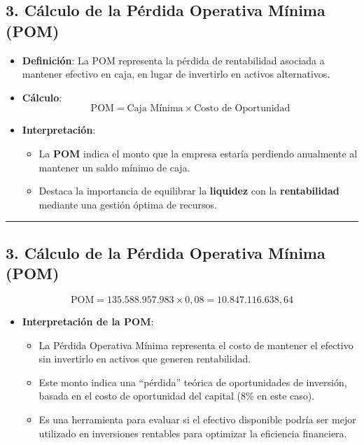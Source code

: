 \documentclass[
  letterpaper,
  DIV=11,
  numbers=noendperiod]{scrartcl}
\providecommand{\tightlist}{%
  \setlength{\itemsep}{0pt}\setlength{\parskip}{0pt}}\usepackage{longtable,booktabs,array}
\begin{document}
\subsection{3. Cálculo de la Pérdida Operativa Mínima
(POM)}\label{cuxe1lculo-de-la-puxe9rdida-operativa-muxednima-pom}

\begin{itemize}
\item
  \textbf{Definición}: La POM representa la pérdida de rentabilidad
  asociada a mantener efectivo en caja, en lugar de invertirlo en
  activos alternativos.
\item
  \textbf{Cálculo}: \[
   \text{POM} = \text{Caja Mínima} \times \text{Costo de Oportunidad}
   \]
\item
  \textbf{Interpretación}:

  \begin{itemize}
  \tightlist
  \item
    La \textbf{POM} indica el monto que la empresa estaría perdiendo
    anualmente al mantener un saldo mínimo de caja.
  \item
    Destaca la importancia de equilibrar la \textbf{liquidez} con la
    \textbf{rentabilidad} mediante una gestión óptima de recursos.
  \end{itemize}
\end{itemize}

\begin{center}\rule{0.5\linewidth}{0.5pt}\end{center}

\subsection{3. Cálculo de la Pérdida Operativa Mínima
(POM)}\label{cuxe1lculo-de-la-puxe9rdida-operativa-muxednima-pom-1}

\[
\text{POM} = 135.588.957.983 \times 0,08 = 10.847.116.638,64
\]

\begin{itemize}
\tightlist
\item
  \textbf{Interpretación de la POM}:

  \begin{itemize}
  \tightlist
  \item
    La Pérdida Operativa Mínima representa el costo de mantener el
    efectivo sin invertirlo en activos que generen rentabilidad.
  \item
    Este monto indica una ``pérdida'' teórica de oportunidades de
    inversión, basada en el costo de oportunidad del capital (8\% en
    este caso).
  \item
    Es una herramienta para evaluar si el efectivo disponible podría ser
    mejor utilizado en inversiones rentables para optimizar la
    eficiencia financiera.
  \end{itemize}
\end{itemize}
\end{document}
